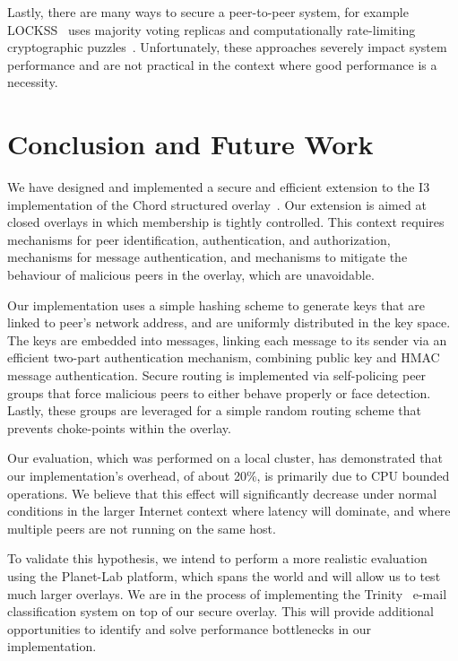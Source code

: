 \documentclass[11pt]{article}
\begin{document}
Lastly, there are many ways to secure a peer-to-peer system, for
example LOCKSS~\cite{MaRoRoBaGiMu03} uses majority voting replicas
and computationally rate-limiting cryptographic puzzles~\cite{DwNa92}.
Unfortunately, these approaches severely impact system performance
and are not practical in the context where good performance is a
necessity.


\section{Conclusion and Future Work}\label{sec:conc}
We have designed and implemented a secure and efficient extension
to the I3~\cite{StAdZhShSu04} implementation of the Chord structured
overlay~\cite{StMoKaKaBa01}.  Our extension is aimed at closed
overlays in which membership is tightly controlled.  This context
requires mechanisms for peer identification, authentication, and
authorization, mechanisms for message authentication, and mechanisms
to mitigate the behaviour of malicious peers in the overlay, which
are unavoidable.

Our implementation uses a simple hashing scheme to generate keys
that are linked to peer's network address, and are uniformly
distributed in the key space.  The keys are embedded into messages,
linking each message to its sender via an efficient two-part
authentication mechanism, combining public key and HMAC message
authentication.  Secure routing is implemented via self-policing
peer groups that force malicious peers to either behave properly
or face detection.  Lastly, these groups are leveraged for a simple
random routing scheme that prevents choke-points within the overlay.

Our evaluation, which was performed on a local cluster, has
demonstrated that our implementation's overhead, of about 20\%, is
primarily due to CPU bounded operations.  We believe that this
effect will significantly decrease under normal conditions in the
larger Internet context where latency will dominate, and where
multiple peers are not running on the same host.

To validate this hypothesis, we intend to perform a more realistic
evaluation using the Planet-Lab platform, which spans the world and
will allow us to test much larger overlays.  We are in the process
of implementing the Trinity~\cite{BrBr07} e-mail classification
system on top of our secure overlay.  This will provide additional
opportunities to identify and solve performance bottlenecks in our
implementation.





 

\end{document}

